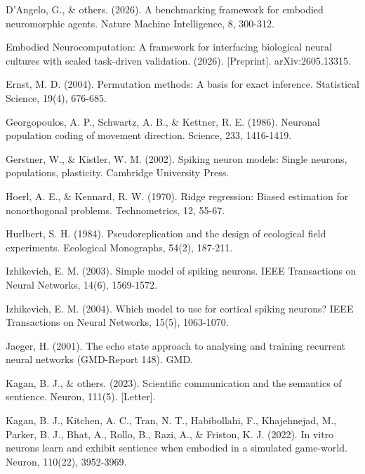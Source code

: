 \documentclass[12pt]{article}
\begin{document}
\noindent D'Angelo, G., \& others. (2026). A benchmarking framework for embodied neuromorphic agents. Nature Machine Intelligence, 8, 300-312.
\par

\noindent Embodied Neurocomputation: A framework for interfacing biological neural cultures with scaled task-driven validation. (2026). [Preprint]. arXiv:2605.13315.
\par

\noindent Ernst, M. D. (2004). Permutation methods: A basis for exact inference. Statistical Science, 19(4), 676-685.
\par

\noindent Georgopoulos, A. P., Schwartz, A. B., \& Kettner, R. E. (1986). Neuronal population coding of movement direction. Science, 233, 1416-1419.
\par

\noindent Gerstner, W., \& Kistler, W. M. (2002). Spiking neuron models: Single neurons, populations, plasticity. Cambridge University Press.
\par

\noindent Hoerl, A. E., \& Kennard, R. W. (1970). Ridge regression: Biased estimation for nonorthogonal problems. Technometrics, 12, 55-67.
\par

\noindent Hurlbert, S. H. (1984). Pseudoreplication and the design of ecological field experiments. Ecological Monographs, 54(2), 187-211.
\par

\noindent Izhikevich, E. M. (2003). Simple model of spiking neurons. IEEE Transactions on Neural Networks, 14(6), 1569-1572.
\par

\noindent Izhikevich, E. M. (2004). Which model to use for cortical spiking neurons? IEEE Transactions on Neural Networks, 15(5), 1063-1070.
\par

\noindent Jaeger, H. (2001). The echo state approach to analysing and training recurrent neural networks (GMD-Report 148). GMD.
\par

\noindent Kagan, B. J., \& others. (2023). Scientific communication and the semantics of sentience. Neuron, 111(5). [Letter].
\par

\noindent Kagan, B. J., Kitchen, A. C., Tran, N. T., Habibollahi, F., Khajehnejad, M., Parker, B. J., Bhat, A., Rollo, B., Razi, A., \& Friston, K. J. (2022). In vitro neurons learn and exhibit sentience when embodied in a simulated game-world. Neuron, 110(22), 3952-3969.
\par
\end{document}
